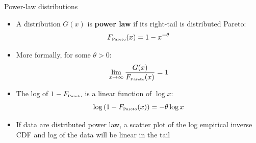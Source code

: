 \documentclass[notes=show]{beamer}
\begin{document}
\begin{frame}{Power-law distributions}

    \begin{itemize} 
        \item A distribution $G(x)$ is \textbf{power law} if its right-tail is distributed Pareto:
            \begin{equation}
                F_{\mbox{{\tiny{Pareto}}}}(x) = 1 - x^{-\theta} \nonumber
            \end{equation}
        \item More formally, for some $\theta > 0$:
            \begin{equation}
                \lim_{x\rightarrow \infty} \frac{G(x)}{F_{\mbox{\tiny{Pareto}}}(x)} = 1 \nonumber
            \end{equation}
        \item The log of $1 - F_{\mbox{{\tiny{Pareto}}}}$ is a linear function of $\log{x}$:
            \begin{equation}
                \log\left({1 - F_{\mbox{\tiny{Pareto}}}(x)}\right) = -\theta \log{x} \nonumber
            \end{equation}
        \item If data are distributed power law, a scatter plot of the log empirical inverse CDF and log of the data will be linear in the tail
    \end{itemize}

\end{frame}
\end{document}
